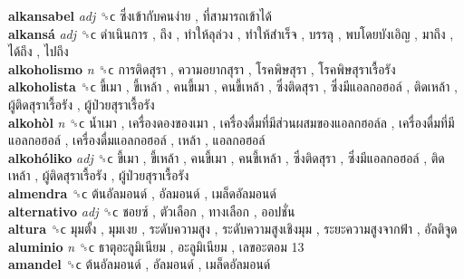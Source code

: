 \textbf{alkansabel} \emph{adj}  ␝ϲ   ซึ่งเข้ากับคนง่าย ,  ที่สามารถเข้าได้   \\
\textbf{alkansá} \emph{adj}  ␝ϲ   ดำเนินการ ,  ถึง ,  ทำให้ลุล่วง ,  ทำให้สำเร็จ ,  บรรลุ ,  พบโดยบังเอิญ ,  มาถึง ,  ได้ถึง ,  ไปถึง   \\
\textbf{alkoholismo} \emph{n}  ␝ϲ   การติดสุรา ,  ความอยากสุรา ,  โรคพิษสุรา ,  โรคพิษสุราเรื้อรัง   \\
\textbf{alkoholista} ␝ϲ   ขี้เมา ,  ขี้เหล้า ,  คนขี้เมา ,  คนขี้เหล้า ,  ซึ่งติดสุรา ,  ซึ่งมีแอลกอฮอล์ ,  ติดเหล้า ,  ผู้ติดสุราเรื้อรัง ,  ผู้ป่วยสุราเรื้อรัง   \\
\textbf{alkohòl} \emph{n}  ␝ϲ   น้ำเมา ,  เครื่องดองของเมา ,  เครื่องดื่มที่มีส่วนผสมของแอลกฮอล์ล ,  เครื่องดื่มที่มีแอลกอฮอล์ ,  เครื่องดื่มแอลกอฮอล์ ,  เหล้า ,  แอลกอฮอล์   \\
\textbf{alkohóliko} \emph{adj}  ␝ϲ   ขี้เมา ,  ขี้เหล้า ,  คนขี้เมา ,  คนขี้เหล้า ,  ซึ่งติดสุรา ,  ซึ่งมีแอลกอฮอล์ ,  ติดเหล้า ,  ผู้ติดสุราเรื้อรัง ,  ผู้ป่วยสุราเรื้อรัง   \\
\textbf{almendra} ␝ϲ   ต้นอัลมอนด์ ,  อัลมอนด์ ,  เมล็ดอัลมอนด์   \\
\textbf{alternativo} \emph{adj}  ␝ϲ   ชอยซ์ ,  ตัวเลือก ,  ทางเลือก ,  ออปชั่น   \\
\textbf{altura} ␝ϲ   มุมตั้ง ,  มุมเงย ,  ระดับความสูง ,  ระดับความสูงเชิงมุม ,  ระยะความสูงจากฟ้า ,  อัลติจูด   \\
\textbf{aluminio} \emph{n}  ␝ϲ   ธาตุอะลูมิเนียม ,  อะลูมิเนียม ,  เลขอะตอม 13   \\
\textbf{amandel} ␝ϲ   ต้นอัลมอนด์ ,  อัลมอนด์ ,  เมล็ดอัลมอนด์   \\
